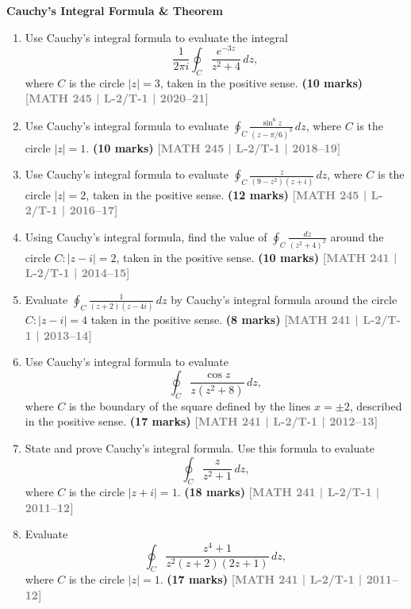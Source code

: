 \documentclass[12pt,a4paper]{article}
\newcommand{\yr}[1]{\hfill\textcolor{gray}{\small\textbf{[#1]}}}
\newcommand{\mk}[1]{\textcolor{orange!70!black}{\small\textbf{(#1 marks)}}}
\newcommand{\subtopic}[2]{%
  \vspace{10pt}
  \noindent\begin{tcolorbox}[colback=#1!8,colframe=#1,boxrule=0.6pt,arc=4pt,
    left=6pt,right=6pt,top=4pt,bottom=4pt]
    \small\bfseries\textcolor{#1}{#2}
  \end{tcolorbox}
  \vspace{2pt}
}
\begin{document}
\subtopic{cE}{Cauchy's Integral Formula \& Theorem}
\label{sub:s5-cauchy}

\begin{enumerate}\item Use Cauchy's integral formula to evaluate the integral
\[
\frac{1}{2\pi i}\oint_{C} \frac{e^{-3z}}{z^{2}+4}\,dz,
\]
where $C$ is the circle $|z|=3$, taken in the positive sense.
\mk{10} \yr{MATH 245 | L-2/T-1 | 2020--21}

\item Use Cauchy's integral formula to evaluate $\displaystyle\oint_{C}\frac{\sin^{6}z}{(z-\pi/6)^{3}}\,dz$, where $C$ is the circle $|z|=1$.
\mk{10} \yr{MATH 245 | L-2/T-1 | 2018--19}

\item Use Cauchy's integral formula to evaluate $\displaystyle\oint_{C}\frac{z}{(9-z^{2})(z+i)}\,dz$, where $C$ is the circle $|z|=2$, taken in the positive sense.
\mk{12} \yr{MATH 245 | L-2/T-1 | 2016--17}

\item Using Cauchy's integral formula, find the value of $\displaystyle\oint_{C}\frac{dz}{(z^{2}+4)^{2}}$ around the circle $C\colon|z-i|=2$, taken in the positive sense.
\mk{10} \yr{MATH 241 | L-2/T-1 | 2014--15}

\item Evaluate $\displaystyle\oint_{C} \frac{1}{(z+2)(z-4i)}\,dz$ by Cauchy's integral formula around the circle $C\colon |z-i|=4$ taken in the positive sense.
\mk{8} \yr{MATH 241 | L-2/T-1 | 2013--14}

\item Use Cauchy's integral formula to evaluate
\[
\oint_{C} \frac{\cos z}{z(z^{2}+8)}\,dz,
\]
where $C$ is the boundary of the square defined by the lines $x=\pm 2$, described in the positive sense.
\mk{17} \yr{MATH 241 | L-2/T-1 | 2012--13}

\item State and prove Cauchy's integral formula. Use this formula to evaluate
\[
\oint_{C} \frac{z}{z^{2}+1}\,dz,
\]
where $C$ is the circle $|z+i|=1$.
\mk{18} \yr{MATH 241 | L-2/T-1 | 2011--12}

\item Evaluate
\[
\oint_{C} \frac{z^{4}+1}{z^{2}(z+2)(2z+1)}\,dz,
\]
where $C$ is the circle $|z|=1$.
\mk{17} \yr{MATH 241 | L-2/T-1 | 2011--12}

\end{enumerate}
\end{document}
